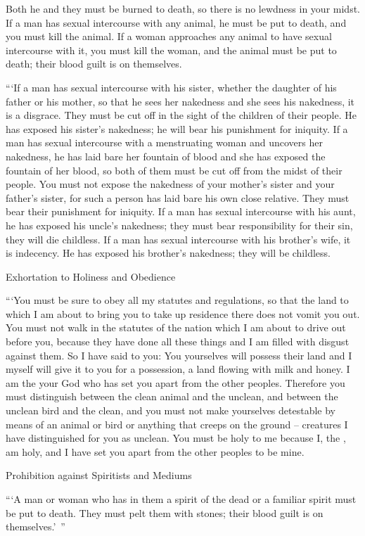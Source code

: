 {Both he and they must be burned
to death, so there
is no
lewdness
in your midst.
If a man
has sexual
intercourse
with any animal,
he must
be put to death,
and you must kill
the animal.
If a woman
approaches
any
animal
to have sexual
intercourse with
it, you must kill
the woman,
and the animal
must
be put to death;
their blood guilt is on themselves.
\par }{\PP {}“‘If a man
has
sexual
intercourse with his sister,
whether the daughter
of his father
or
his mother,
so that he sees
her nakedness
and she sees
his nakedness,
it is a disgrace.
They must be cut off
in the sight
of the children
of their people.
He has exposed his sister’s
nakedness;
he will bear
his punishment for iniquity.
If a man
has
sexual
intercourse with
a menstruating
woman
and uncovers
her nakedness,
he has laid bare
her fountain
of blood and she
has exposed
the
fountain
of her blood,
so both
of them must be cut off
from the midst
of their people.
You must not
expose
the nakedness
of your mother’s
sister
and your father’s
sister, for
such a person has laid bare
his own close relative.
They must bear
their punishment
for iniquity.
If a man
has
sexual
intercourse with
his aunt,
he has exposed his uncle’s
nakedness;
they must bear
responsibility
for their sin, they will die
childless.
If a man
has sexual intercourse with
his brother’s
wife,
it is indecency.
He has exposed
his brother’s
nakedness;
they will be
childless.
\par }{\SH Exhortation to Holiness and Obedience
\par }{\PP {}“‘You must be sure to obey
all
my statutes
and regulations,
so that the land
to which
I am
about to bring
you to take up residence
there
does
not
vomit you out.
You must not
walk
in the statutes
of the nation
which
I am
about to drive
out before
you, because
they have done
all
these
things and I am filled with disgust against them.
So I have said
to you: You yourselves
will possess
their land
and I myself
will give
it to you for a possession,
a land
flowing
with milk
and honey.
I am
the {}
your God
who has
set you apart
from
the other peoples.
Therefore you must distinguish
between
the clean
animal
and the unclean,
and between
the unclean
bird
and the clean,
and you must not
make yourselves detestable
by means
of an animal
or bird
or anything
that
creeps
on the ground
– creatures I have distinguished
for you as unclean.
You must be
holy
to me because
I, the
{},
am
holy,
and I have set you apart
from
the other peoples
to be mine.
\par }{\SH Prohibition against Spiritists and Mediums
\par }{\PP {}“‘A man
or
woman
who has
in them a spirit
of the dead or
a familiar spirit
must
be put to death.
They must pelt
them with stones;
their blood guilt is on themselves.’ ”

}
